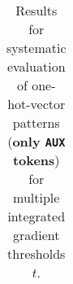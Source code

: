 \begin{table}[t]
\begin{tabular}{lllllll}

\hline
\end{tabular}
\caption[Model Evaluation for only \texttt{AUX} tokens]{Results for systematic evaluation of one-hot-vector patterns (\textbf{only \texttt{AUX} tokens}) for multiple integrated gradient thresholds $t$.}
\label{tab:evalResultsAUX}
\end{table}
	